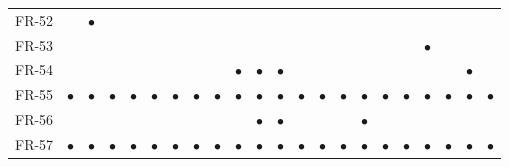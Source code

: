 \documentclass[11pt,a4paper]{article}
\begin{document}
\begin{longtable}{@{}l*{21}{c}@{}}
FR-52&&\cellcolor{hdr}\textcolor{creBlue}{$\bullet$}&&&&&&&&&&&&&&&&&&&\\
FR-53&&&&&&&&&&&&&&&&&&\cellcolor{hdr}\textcolor{creBlue}{$\bullet$}&&&\\
FR-54&&&&&&&&&\cellcolor{hdr}\textcolor{creBlue}{$\bullet$}&\cellcolor{hdr}\textcolor{creBlue}{$\bullet$}&\cellcolor{hdr}\textcolor{creBlue}{$\bullet$}&&&&&&&&&\cellcolor{hdr}\textcolor{creBlue}{$\bullet$}&\\
FR-55&\cellcolor{hdr}\textcolor{creBlue}{$\bullet$}&\cellcolor{hdr}\textcolor{creBlue}{$\bullet$}&\cellcolor{hdr}\textcolor{creBlue}{$\bullet$}&\cellcolor{hdr}\textcolor{creBlue}{$\bullet$}&\cellcolor{hdr}\textcolor{creBlue}{$\bullet$}&\cellcolor{hdr}\textcolor{creBlue}{$\bullet$}&\cellcolor{hdr}\textcolor{creBlue}{$\bullet$}&\cellcolor{hdr}\textcolor{creBlue}{$\bullet$}&\cellcolor{hdr}\textcolor{creBlue}{$\bullet$}&\cellcolor{hdr}\textcolor{creBlue}{$\bullet$}&\cellcolor{hdr}\textcolor{creBlue}{$\bullet$}&\cellcolor{hdr}\textcolor{creBlue}{$\bullet$}&\cellcolor{hdr}\textcolor{creBlue}{$\bullet$}&\cellcolor{hdr}\textcolor{creBlue}{$\bullet$}&\cellcolor{hdr}\textcolor{creBlue}{$\bullet$}&\cellcolor{hdr}\textcolor{creBlue}{$\bullet$}&\cellcolor{hdr}\textcolor{creBlue}{$\bullet$}&\cellcolor{hdr}\textcolor{creBlue}{$\bullet$}&\cellcolor{hdr}\textcolor{creBlue}{$\bullet$}&\cellcolor{hdr}\textcolor{creBlue}{$\bullet$}&\cellcolor{hdr}\textcolor{creBlue}{$\bullet$}\\
FR-56&&&&&&&&&&\cellcolor{hdr}\textcolor{creBlue}{$\bullet$}&\cellcolor{hdr}\textcolor{creBlue}{$\bullet$}&&&&\cellcolor{hdr}\textcolor{creBlue}{$\bullet$}&&&&&&\\
FR-57&\cellcolor{hdr}\textcolor{creBlue}{$\bullet$}&\cellcolor{hdr}\textcolor{creBlue}{$\bullet$}&\cellcolor{hdr}\textcolor{creBlue}{$\bullet$}&\cellcolor{hdr}\textcolor{creBlue}{$\bullet$}&\cellcolor{hdr}\textcolor{creBlue}{$\bullet$}&\cellcolor{hdr}\textcolor{creBlue}{$\bullet$}&\cellcolor{hdr}\textcolor{creBlue}{$\bullet$}&\cellcolor{hdr}\textcolor{creBlue}{$\bullet$}&\cellcolor{hdr}\textcolor{creBlue}{$\bullet$}&\cellcolor{hdr}\textcolor{creBlue}{$\bullet$}&\cellcolor{hdr}\textcolor{creBlue}{$\bullet$}&\cellcolor{hdr}\textcolor{creBlue}{$\bullet$}&\cellcolor{hdr}\textcolor{creBlue}{$\bullet$}&\cellcolor{hdr}\textcolor{creBlue}{$\bullet$}&\cellcolor{hdr}\textcolor{creBlue}{$\bullet$}&\cellcolor{hdr}\textcolor{creBlue}{$\bullet$}&\cellcolor{hdr}\textcolor{creBlue}{$\bullet$}&\cellcolor{hdr}\textcolor{creBlue}{$\bullet$}&\cellcolor{hdr}\textcolor{creBlue}{$\bullet$}&\cellcolor{hdr}\textcolor{creBlue}{$\bullet$}&\cellcolor{hdr}\textcolor{creBlue}{$\bullet$}\\
\bottomrule
\end{longtable}
\endgroup
\end{document}
